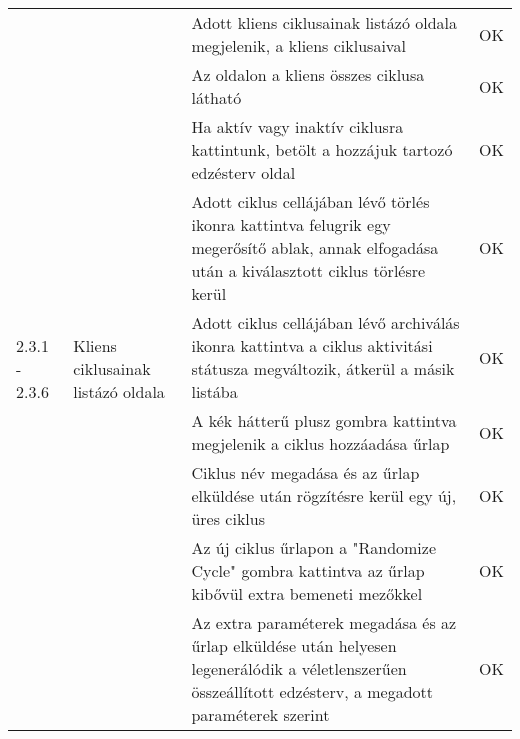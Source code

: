 \begin{center}
\begin{longtable}{ | p{} | p{} | p{} | p{} | }
			\multirow{9}{=}{2.3.1 - 2.3.6} 
			& \multirow{9}{=}{Kliens ciklusainak listázó oldala} 
			& Adott kliens ciklusainak listázó oldala megjelenik, a kliens ciklusaival
			& OK \\
			\cline{3-4}
			& & Az oldalon a kliens összes ciklusa látható 
			& OK \\
			\cline{3-4}
			& & Ha aktív vagy inaktív ciklusra kattintunk, betölt a hozzájuk tartozó edzésterv oldal
			& OK \\
			\cline{3-4}
			& & Adott ciklus cellájában lévő törlés ikonra kattintva felugrik egy megerősítő ablak, annak elfogadása után a kiválasztott ciklus törlésre kerül
			& OK \\
			\cline{3-4}
			& & Adott ciklus cellájában lévő archiválás ikonra kattintva a ciklus aktivitási státusza megváltozik, átkerül a másik listába
			& OK \\
			\cline{3-4}
			& & A kék hátterű plusz gombra kattintva megjelenik a ciklus hozzáadása űrlap
			& OK \\
			\cline{3-4}
			& & Ciklus név megadása és az űrlap elküldése után rögzítésre kerül egy új, üres ciklus
			& OK \\
			\cline{3-4}
			& & Az új ciklus űrlapon a "Randomize Cycle" gombra kattintva az űrlap kibővül extra bemeneti mezőkkel
			& OK \\
			\cline{3-4}
			& & Az extra paraméterek megadása és az űrlap elküldése után helyesen legenerálódik a véletlenszerűen összeállított edzésterv, a megadott paraméterek szerint
			& OK \\
			\hline


\end{longtable}
\end{center}
